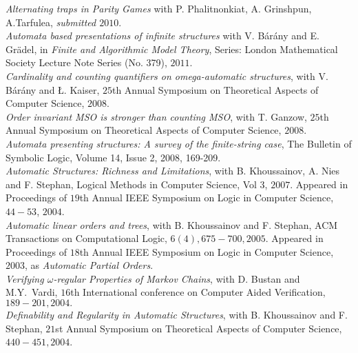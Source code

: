 \documentclass[a4paper]{article}
\begin{document}
{\it Alternating traps in Parity Games} with P. Phalitnonkiat, A. Grinshpun, A.Tarfulea, {\it submitted $2010$}.\\

{\it Automata based presentations of infinite structures} with V. B{\'a}r{\'a}ny and E. Gr{\"a}del,
in {\it Finite and Algorithmic Model Theory},
Series: London Mathematical Society Lecture Note Series (No. 379), $2011$.\\

{\it Cardinality and counting quantifiers on omega-automatic structures}, with V.  B{\'a}r{\'a}ny and \L. Kaiser, 
$25$th Annual Symposium on Theoretical Aspects of Computer Science, $2008$.  \\

{\it Order invariant MSO is stronger than counting MSO}, with T. Ganzow, 
$25$th Annual Symposium on Theoretical Aspects of Computer Science, $2008$.  \\

{\it Automata presenting structures: A survey of the finite-string case}, The Bulletin of Symbolic Logic, 
Volume 14, Issue 2, 2008, 169-209.\\

{\it Automatic Structures: Richness and Limitations}, with B. Khoussainov, A. Nies and F. Stephan, 
Logical Methods in Computer Science, Vol $3$, $2007$. Appeared in Proceedings of 
$19$th Annual {IEEE} Symposium on Logic in Computer Science, $44-53$, $2004$. \\

{\it Automatic linear orders and trees}, with B. Khoussainov and F. Stephan, 
ACM Transactions on Computational Logic,
$6 (4), 675-700, 2005$. Appeared in 
Proceedings of $18$th Annual IEEE Symposium on Logic in Computer Science, $2003$,
as {\it Automatic Partial Orders}.  \\

{\it Verifying $\omega$-regular Properties of Markov Chains}, with D. Bustan and
M.Y.~Vardi, $16$th International conference on Computer Aided Verification,
$189-201, 2004.$ \\

 
{\it Definability and Regularity in Automatic Structures}, with B. Khoussainov
and F. Stephan, $21$st Annual Symposium on Theoretical Aspects of 
Computer Science, $440-451, 2004$.  \\
 
\end{document}
